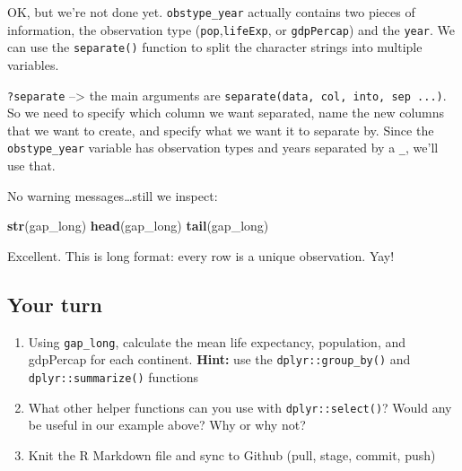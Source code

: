 \documentclass[]{book}
\newenvironment{Shaded}{\begin{snugshade}}{\end{snugshade}}
\newcommand{\KeywordTok}[1]{\textcolor[rgb]{0.13,0.29,0.53}{\textbf{#1}}}
\newcommand{\DataTypeTok}[1]{\textcolor[rgb]{0.13,0.29,0.53}{#1}}
\newcommand{\StringTok}[1]{\textcolor[rgb]{0.31,0.60,0.02}{#1}}
\newcommand{\OperatorTok}[1]{\textcolor[rgb]{0.81,0.36,0.00}{\textbf{#1}}}
\newcommand{\NormalTok}[1]{#1}
\theoremstyle{definition}
\theoremstyle{definition}
\theoremstyle{definition}
\theoremstyle{remark}
\begin{document}
OK, but we're not done yet. \texttt{obstype\_year} actually contains two
pieces of information, the observation type
(\texttt{pop},\texttt{lifeExp}, or \texttt{gdpPercap}) and the
\texttt{year}. We can use the \texttt{separate()} function to split the
character strings into multiple variables.

\texttt{?separate} --\textgreater{} the main arguments are
\texttt{separate(data,\ col,\ into,\ sep\ ...)}. So we need to specify
which column we want separated, name the new columns that we want to
create, and specify what we want it to separate by. Since the
\texttt{obstype\_year} variable has observation types and years
separated by a \texttt{\_}, we'll use that.

\begin{Shaded}
\end{Shaded}

No warning messages\ldots{}still we inspect:

\begin{Shaded}
\begin{Highlighting}[]
\KeywordTok{str}\NormalTok{(gap_long)}
\KeywordTok{head}\NormalTok{(gap_long)}
\KeywordTok{tail}\NormalTok{(gap_long)}
\end{Highlighting}
\end{Shaded}

Excellent. This is long format: every row is a unique observation. Yay!

\subsection{Your turn}\label{your-turn-9}

\begin{enumerate}
\def\labelenumi{\arabic{enumi}.}
\item
  Using \texttt{gap\_long}, calculate the mean life expectancy,
  population, and gdpPercap for each continent. \textbf{Hint:} use the
  \texttt{dplyr::group\_by()} and \texttt{dplyr::summarize()} functions
\item
  What other helper functions can you use with \texttt{dplyr::select()}?
  Would any be useful in our example above? Why or why not?
\item
  Knit the R Markdown file and sync to Github (pull, stage, commit,
  push)
\end{enumerate}
\end{document}
